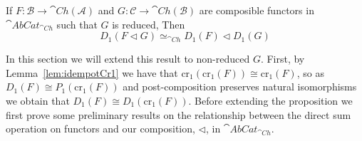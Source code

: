 \begin{prop}[label=prop:5.7]
    If $F:\mathcal{B}\to \cat{Ch}(\mathcal{A})$ and $G:\mathcal{C}\to \cat{Ch}(\mathcal{B})$ are composible functors in $\cat{AbCat}_{\cat{Ch}}$ such that $G$ is reduced, Then
    \begin{equation*}
        D_1(F\lhd G) \simeq_{\cat{Ch}} D_1(F)\lhd D_1(G)
    \end{equation*}
\end{prop}

In this section we will extend this result to non-reduced $G$. First, by Lemma~\ref{lem:idempotCr1} we have that $\text{cr}_1(\text{cr}_1(F))\cong \text{cr}_1(F)$, so as $D_1(F) \cong P_1(\text{cr}_1(F))$ and post-composition preserves natural isomorphisms we obtain that $D_1(F) \cong D_1(\text{cr}_1(F))$. Before extending the proposition we first prove some preliminary results on the relationship between the direct sum operation on functors and our composition, $\lhd$, in $\cat{AbCat}_{\cat{Ch}}$. 

